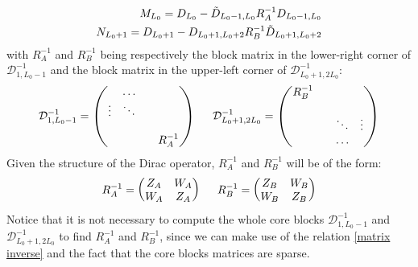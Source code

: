 \begin{equation}\label{M and N}
    \begin{split}
        M_{L_0} = D_{L_0} - \Tilde{D}_{L_0 - 1, L_0} R_A^{-1} D_{L_0 - 1, L_0} \\
        N_{L_0 + 1} = D_{L_0 + 1} - D_{L_0 + 1, L_0 + 2} R_B^{-1} \Tilde{D}_{L_0 + 1, L_0 +2}
    \end{split}
\end{equation}
with $R_A^{-1}$ and $R_B^{-1}$ being respectively the block matrix in the lower-right corner of $\mathcal{D}_{1, L_0 - 1}^{-1}$ and the block matrix in the upper-left corner of $\mathcal{D}_{L_0 + 1, 2L_0}^{-1}$:
\begin{equation}
    \mathcal{D}_{1, L_0 - 1}^{-1} = \begin{pmatrix}
        & \dots & &  \\
        \vdots & \ddots \\
        & & \\
         &  &  & R_A^{-1} \\
    \end{pmatrix} \hspace{5mm}  \mathcal{D}_{L_0 + 1, 2L_0}^{-1} = \begin{pmatrix}
        R_B^{-1} &  \\
         & & &  \\
        & & \ddots & \vdots \\
         & & \dots & \\
    \end{pmatrix}
\end{equation}
Given the structure of the Dirac operator, $R_A^{-1}$ and $R_B^{-1}$ will be of the form:
\begin{equation}
    R_A^{-1} = \begin{pmatrix}
        Z_A & W_A \\
        W_A & Z_A \\
    \end{pmatrix} \hspace{5 mm}  R_B^{-1} = \begin{pmatrix}
        Z_B & W_B \\
        W_B & Z_B \\
    \end{pmatrix}
\end{equation}
Notice that it is not necessary to compute the whole core blocks $\mathcal{D}_{1, L_0 - 1}^{-1}$ and $\mathcal{D}_{L_0 + 1, 2L_0}^{-1}$ to find $R_A^{-1}$ and $R_B^{-1}$, since we can make use of the relation \eqref{matrix inverse} and the fact that the core blocks matrices are sparse.
